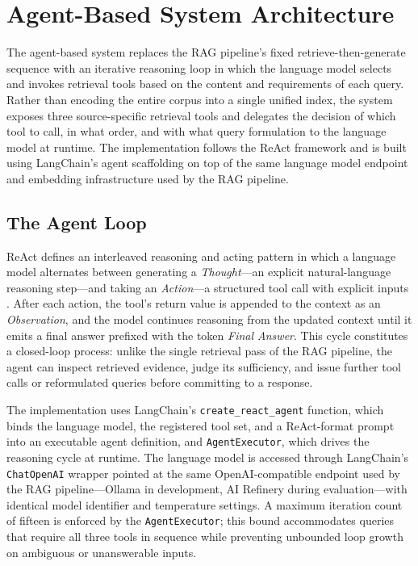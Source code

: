 \section{Agent-Based System Architecture}

The agent-based system replaces the RAG pipeline's fixed retrieve-then-generate sequence with an iterative reasoning loop in which the language model selects and invokes retrieval tools based on the content and requirements of each query. Rather than encoding the entire corpus into a single unified index, the system exposes three source-specific retrieval tools and delegates the decision of which tool to call, in what order, and with what query formulation to the language model at runtime. The implementation follows the ReAct framework \cite{yao2023react} and is built using LangChain's agent scaffolding on top of the same language model endpoint and embedding infrastructure used by the RAG pipeline.

\subsection{The Agent Loop}

ReAct defines an interleaved reasoning and acting pattern in which a language model alternates between generating a \textit{Thought}—an explicit natural-language reasoning step—and taking an \textit{Action}—a structured tool call with explicit inputs \cite{yao2023react}. After each action, the tool's return value is appended to the context as an \textit{Observation}, and the model continues reasoning from the updated context until it emits a final answer prefixed with the token \textit{Final Answer}. This cycle constitutes a closed-loop process: unlike the single retrieval pass of the RAG pipeline, the agent can inspect retrieved evidence, judge its sufficiency, and issue further tool calls or reformulated queries before committing to a response.

The implementation uses LangChain's \texttt{create\_react\_agent} function, which binds the language model, the registered tool set, and a ReAct-format prompt into an executable agent definition, and \texttt{AgentExecutor}, which drives the reasoning cycle at runtime. The language model is accessed through LangChain's \texttt{ChatOpenAI} wrapper pointed at the same OpenAI-compatible endpoint used by the RAG pipeline—Ollama in development, AI Refinery during evaluation—with identical model identifier and temperature settings. A maximum iteration count of fifteen is enforced by the \texttt{AgentExecutor}; this bound accommodates queries that require all three tools in sequence while preventing unbounded loop growth on ambiguous or unanswerable inputs.

